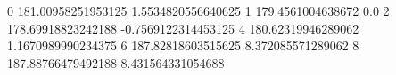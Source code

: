 0 181.00958251953125 1.5534820556640625
1 179.4561004638672 0.0
2 178.69918823242188 -0.7569122314453125
4 180.62319946289062 1.1670989990234375
6 187.82818603515625 8.372085571289062
8 187.88766479492188 8.431564331054688
